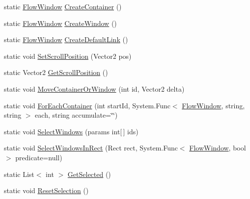 \begin{DoxyCompactItemize}
\item 
static \hyperlink{class_unity_engine_1_1_u_i_1_1_windows_1_1_plugins_1_1_flow_1_1_flow_window}{Flow\+Window} \hyperlink{class_unity_engine_1_1_u_i_1_1_windows_1_1_plugins_1_1_flow_1_1_flow_system_ad592e93fcb05958c5f018af3420f6a35}{Create\+Container} ()
\item 
static \hyperlink{class_unity_engine_1_1_u_i_1_1_windows_1_1_plugins_1_1_flow_1_1_flow_window}{Flow\+Window} \hyperlink{class_unity_engine_1_1_u_i_1_1_windows_1_1_plugins_1_1_flow_1_1_flow_system_ac7e83a8a7a815fe8f55c35d92dab297f}{Create\+Window} ()
\item 
static \hyperlink{class_unity_engine_1_1_u_i_1_1_windows_1_1_plugins_1_1_flow_1_1_flow_window}{Flow\+Window} \hyperlink{class_unity_engine_1_1_u_i_1_1_windows_1_1_plugins_1_1_flow_1_1_flow_system_aabc42dfaa1ab91bc5834869dda279c3f}{Create\+Default\+Link} ()
\item 
static void \hyperlink{class_unity_engine_1_1_u_i_1_1_windows_1_1_plugins_1_1_flow_1_1_flow_system_a2f801ceccec17ed2fad569177a1fd997}{Set\+Scroll\+Position} (Vector2 pos)
\item 
static Vector2 \hyperlink{class_unity_engine_1_1_u_i_1_1_windows_1_1_plugins_1_1_flow_1_1_flow_system_acba2af60aa521ac0eaf383dadc77d3af}{Get\+Scroll\+Position} ()
\item 
static void \hyperlink{class_unity_engine_1_1_u_i_1_1_windows_1_1_plugins_1_1_flow_1_1_flow_system_a436ac02d60d711ae484b91ec52cf5531}{Move\+Container\+Or\+Window} (int id, Vector2 delta)
\item 
static void \hyperlink{class_unity_engine_1_1_u_i_1_1_windows_1_1_plugins_1_1_flow_1_1_flow_system_a49aba3010ff83a0d7fdb943812c7b723}{For\+Each\+Container} (int start\+Id, System.\+Func$<$ \hyperlink{class_unity_engine_1_1_u_i_1_1_windows_1_1_plugins_1_1_flow_1_1_flow_window}{Flow\+Window}, string, string $>$ each, string accumulate=\char`\"{}\char`\"{})
\item 
static void \hyperlink{class_unity_engine_1_1_u_i_1_1_windows_1_1_plugins_1_1_flow_1_1_flow_system_affee97514b8017d31231580d27ebfd79}{Select\+Windows} (params int\mbox{[}$\,$\mbox{]} ids)
\item 
static void \hyperlink{class_unity_engine_1_1_u_i_1_1_windows_1_1_plugins_1_1_flow_1_1_flow_system_a3d0dc83b3e5ef06d319bee31193a5b8c}{Select\+Windows\+In\+Rect} (Rect rect, System.\+Func$<$ \hyperlink{class_unity_engine_1_1_u_i_1_1_windows_1_1_plugins_1_1_flow_1_1_flow_window}{Flow\+Window}, bool $>$ predicate=null)
\item 
static List$<$ int $>$ \hyperlink{class_unity_engine_1_1_u_i_1_1_windows_1_1_plugins_1_1_flow_1_1_flow_system_a01b8616a1456058ae83d81165b309d21}{Get\+Selected} ()
\item 
static void \hyperlink{class_unity_engine_1_1_u_i_1_1_windows_1_1_plugins_1_1_flow_1_1_flow_system_aa4df5d8c52cfd0f086fd921f00f7b423}{Reset\+Selection} ()
\end{DoxyCompactItemize}
